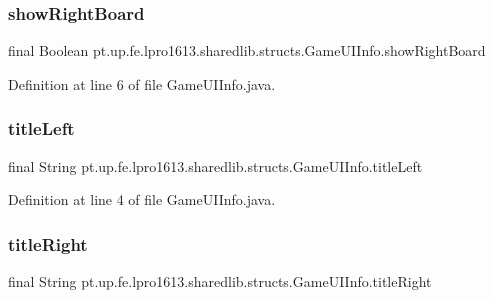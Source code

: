 \subsubsection{\texorpdfstring{show\+Right\+Board}{showRightBoard}}
{\footnotesize\ttfamily final Boolean pt.\+up.\+fe.\+lpro1613.\+sharedlib.\+structs.\+Game\+U\+I\+Info.\+show\+Right\+Board}



Definition at line 6 of file Game\+U\+I\+Info.\+java.

\hypertarget{classpt_1_1up_1_1fe_1_1lpro1613_1_1sharedlib_1_1structs_1_1_game_u_i_info_a798fd7d7503ee81e37866d82d02705ee}{}\label{classpt_1_1up_1_1fe_1_1lpro1613_1_1sharedlib_1_1structs_1_1_game_u_i_info_a798fd7d7503ee81e37866d82d02705ee} 
\subsubsection{\texorpdfstring{title\+Left}{titleLeft}}
{\footnotesize\ttfamily final String pt.\+up.\+fe.\+lpro1613.\+sharedlib.\+structs.\+Game\+U\+I\+Info.\+title\+Left}



Definition at line 4 of file Game\+U\+I\+Info.\+java.

\hypertarget{classpt_1_1up_1_1fe_1_1lpro1613_1_1sharedlib_1_1structs_1_1_game_u_i_info_a335b692f6aa35df7e3489f5e20b2cade}{}\label{classpt_1_1up_1_1fe_1_1lpro1613_1_1sharedlib_1_1structs_1_1_game_u_i_info_a335b692f6aa35df7e3489f5e20b2cade} 
\subsubsection{\texorpdfstring{title\+Right}{titleRight}}
{\footnotesize\ttfamily final String pt.\+up.\+fe.\+lpro1613.\+sharedlib.\+structs.\+Game\+U\+I\+Info.\+title\+Right}



